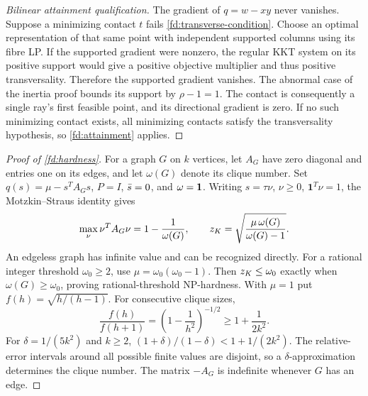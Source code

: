 \begin{proof}[Bilinear attainment qualification]
\label{fd:bilinear-attainment-proof}
The gradient of $q=w-xy$ never vanishes. Suppose a minimizing
contact $t$ fails \cref{fd:transverse-condition}. Choose an optimal
representation of that same point with independent supported columns
using its fibre LP. If the supported gradient were nonzero, the
regular KKT system on its positive support would give a positive
objective multiplier and thus positive transversality.
Therefore the supported gradient vanishes. The abnormal case of
the inertia proof bounds its support by $\rho-1=1$.
The contact is consequently a single ray's first feasible point,
and its directional gradient is zero. If no such minimizing contact
exists, all minimizing contacts satisfy the transversality hypothesis,
so \cref{fd:attainment} applies.
\end{proof}

\begin{proof}[Proof of \cref{fd:hardness}]
\label{fd:hardness-proof}
For a graph $G$ on $k$ vertices, let $A_G$ have zero diagonal and
entries one on its edges, and let $\omega(G)$ denote its clique number. Set
$q(s)=\mu-s^TA_Gs$, $P=I$, $\bar s=0$, and $\omega=\mathbf1$.
Writing $s=\tau\nu$, $\nu\ge0$, $\mathbf1^T\nu=1$, the Motzkin--Straus
identity \citep{MotzkinStraus1965} gives
\[
 \max_\nu\nu^TA_G\nu=1-\frac1{\omega(G)},\qquad
 z_K=\sqrt{\frac{\mu\,\omega(G)}{\omega(G)-1}}.
\]
An edgeless graph has infinite value and can be recognized directly.
For a rational integer threshold $\omega_0\ge2$, use
$\mu=\omega_0(\omega_0-1)$. Then
$z_K\le\omega_0$ exactly when $\omega(G)\ge\omega_0$, proving
rational-threshold NP-hardness.
With $\mu=1$ put $f(h)=\sqrt{h/(h-1)}$. For consecutive clique sizes,
\[
 \frac{f(h)}{f(h+1)}
 =\left(1-\frac1{h^2}\right)^{-1/2}
 \ge1+\frac1{2k^2}.
\]
For $\delta=1/(5k^2)$ and $k\ge2$,
$(1+\delta)/(1-\delta)<1+1/(2k^2)$.
The relative-error intervals around all possible finite values
are disjoint, so a $\delta$-approximation determines the clique
number. The matrix $-A_G$ is indefinite whenever $G$ has an edge.
\end{proof}


